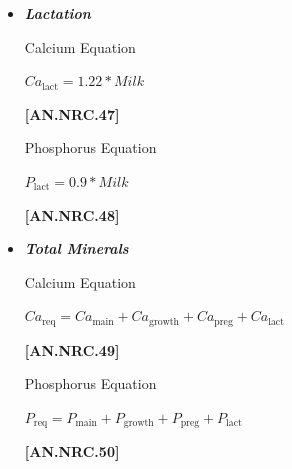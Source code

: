 \documentclass{article}
\begin{document}
\begin{refsection}
\begin{itemize}
\begin{center}
    \textbf{If:} \( DOP > 190.0\ else\)
\end{center}

\vspace{0.5cm}
            {\raggedleft \textbf{[AN.NRC.46]}\par}
\vspace{0.5cm}

        \item \textbf{\textit{Lactation}} 
        \vspace{0.2cm}

Calcium Equation
\begin{center}
    \(Ca_{\text{lact}} = 1.22 * Milk\)
\end{center}

\vspace{0.5cm}
            {\raggedleft \textbf{[AN.NRC.47]}\par}
\vspace{0.5cm}

Phosphorus Equation
                
\begin{center}
    \(P_{\text{lact}} = 0.9 * Milk \)
\end{center}

\vspace{0.5cm}
            {\raggedleft \textbf{[AN.NRC.48]}\par}
\vspace{0.5cm}

        \item \textbf{\textit{Total Minerals}}  
                \vspace{0.2cm}

Calcium Equation
\begin{center}
    \(Ca_{\text{req}} = Ca_{\text{main}} + Ca_{\text{growth}} + Ca_{\text{preg}} + Ca_{\text{lact}}\)
\end{center}

\vspace{0.5cm}
            {\raggedleft \textbf{[AN.NRC.49]}\par}
\vspace{0.5cm}

Phosphorus Equation
\begin{center}
    \(P_{\text{req}} = P_{\text{main}} + P_{\text{growth}} + P_{\text{preg}} + P_{\text{lact}}\)
\end{center}

\vspace{0.5cm}
            {\raggedleft \textbf{[AN.NRC.50]}\par}
\vspace{0.5cm}


\end{itemize}
\end{refsection}
\end{document}

